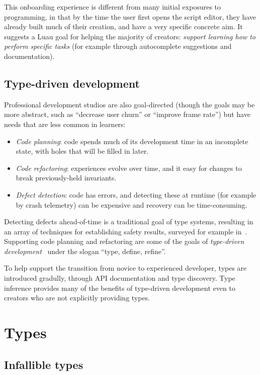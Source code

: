 \documentclass[acmsmall]{acmart}
\begin{document}
This onboarding experience is different from many initial exposures to
programming, in that by the time the user first opens the script
editor, they have already built much of their creation, and have a
very specific concrete aim.  It suggests a Luau goal for helping the
majority of creators: \emph{support learning how to perform specific
tasks} (for example through autocomplete suggestions and
documentation).

\subsection{Type-driven development}

Professional development studios are also goal-directed (though the
goals may be more abstract, such as ``decrease user churn'' or
``improve frame rate'') but have needs that are less common in
learners:
\begin{itemize}

\item \emph{Code planning}:
  code spends much of its development time in an incomplete state,
  with holes that will be filled in later.

\item \emph{Code refactoring}:
  experiences evolve over time, and it easy for changes to
  break previously-held invariants.

\item \emph{Defect detection}:
  code has errors, and detecting these at runtime (for example by crash telemetry)
  can be expensive and recovery can be time-consuming.
  
\end{itemize}
Detecting defects ahead-of-time is a traditional goal of type systems,
resulting in an array of techniques for establishing safety results,
surveyed for example in~\cite{TAPL}. Supporting code planning and
refactoring are some of the goals of \emph{type-driven
development}~\cite{TDDIdris} under the slogan ``type, define,
refine''.

To help support the transition from novice to experienced developer,
types are introduced gradully, through API documentation and type discovery.
Type inference provides many of the benefits of type-driven development
even to creators who are not explicitly providing types.

\section{Types}
\subsection{Infallible types}
\end{document}
